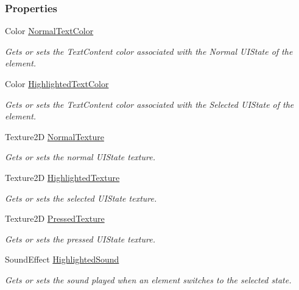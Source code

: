\subsubsection*{Properties}
\begin{DoxyCompactItemize}
\item 
Color \hyperlink{class_m_b2_d_1_1_u_i_1_1_u_i_control_element_a3f7eb009aa193cb3daf4057290b7d4ce}{Normal\+Text\+Color}
\begin{DoxyCompactList}\small\item\em Gets or sets the Text\+Content color associated with the Normal U\+I\+State of the element. \end{DoxyCompactList}\item 
Color \hyperlink{class_m_b2_d_1_1_u_i_1_1_u_i_control_element_aab215aee6dcf8827149dbfcb3721db89}{Highlighted\+Text\+Color}
\begin{DoxyCompactList}\small\item\em Gets or sets the Text\+Content color associated with the Selected U\+I\+State of the element. \end{DoxyCompactList}\item 
Texture2D \hyperlink{class_m_b2_d_1_1_u_i_1_1_u_i_control_element_aa0a258c82660be7625aa011fe038095c}{Normal\+Texture}
\begin{DoxyCompactList}\small\item\em Gets or sets the normal U\+I\+State texture. \end{DoxyCompactList}\item 
Texture2D \hyperlink{class_m_b2_d_1_1_u_i_1_1_u_i_control_element_a0caea5b8e0a7b1af0a18bafff1d986b0}{Highlighted\+Texture}
\begin{DoxyCompactList}\small\item\em Gets or sets the selected U\+I\+State texture. \end{DoxyCompactList}\item 
Texture2D \hyperlink{class_m_b2_d_1_1_u_i_1_1_u_i_control_element_a67a317960e2c07d7871568eba8073025}{Pressed\+Texture}
\begin{DoxyCompactList}\small\item\em Gets or sets the pressed U\+I\+State texture. \end{DoxyCompactList}\item 
Sound\+Effect \hyperlink{class_m_b2_d_1_1_u_i_1_1_u_i_control_element_abc0d689a5a22fe884d243f25141df360}{Highlighted\+Sound}
\begin{DoxyCompactList}\small\item\em Gets or sets the sound played when an element switches to the selected state. \end{DoxyCompactList}\end{DoxyCompactItemize}
